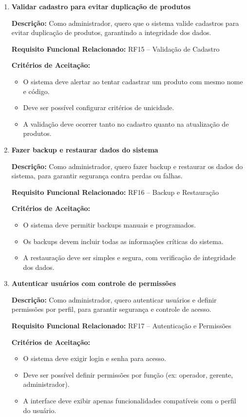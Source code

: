 \documentclass[
	12pt,				%
	openany,			%
	twoside,			%
	a4paper,			%
	english,			%
	brazil				%
	]{abntex2}
\begin{document}
\begin{enumerate}
\item \textbf{Validar cadastro para evitar duplicação de produtos}

\textbf{Descrição:} Como administrador, quero que o sistema valide cadastros para evitar duplicação de produtos, garantindo a integridade dos dados.

\textbf{Requisito Funcional Relacionado:} RF15 -- Validação de Cadastro

\textbf{Critérios de Aceitação:}
\begin{itemize}
  \item O sistema deve alertar ao tentar cadastrar um produto com mesmo nome e código.
  \item Deve ser possível configurar critérios de unicidade.
  \item A validação deve ocorrer tanto no cadastro quanto na atualização de produtos.
\end{itemize}

\item \textbf{Fazer backup e restaurar dados do sistema}

\textbf{Descrição:} Como administrador, quero fazer backup e restaurar os dados do sistema, para garantir segurança contra perdas ou falhas.

\textbf{Requisito Funcional Relacionado:} RF16 -- Backup e Restauração

\textbf{Critérios de Aceitação:}
\begin{itemize}
  \item O sistema deve permitir backups manuais e programados.
  \item Os backups devem incluir todas as informações críticas do sistema.
  \item A restauração deve ser simples e segura, com verificação de integridade dos dados.
\end{itemize}

\item \textbf{Autenticar usuários com controle de permissões}

\textbf{Descrição:} Como administrador, quero autenticar usuários e definir permissões por perfil, para garantir segurança e controle de acesso.

\textbf{Requisito Funcional Relacionado:} RF17 -- Autenticação e Permissões

\textbf{Critérios de Aceitação:}
\begin{itemize}
  \item O sistema deve exigir login e senha para acesso.
  \item Deve ser possível definir permissões por função (ex: operador, gerente, administrador).
  \item A interface deve exibir apenas funcionalidades compatíveis com o perfil do usuário.
\end{itemize}


\end{enumerate}
\end{document}
